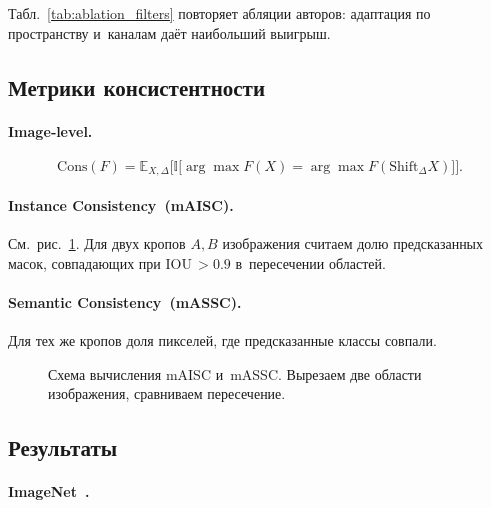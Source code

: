 Табл.~\ref{tab:ablation_filters} повторяет абляции авторов: 
адаптация по пространству и каналам даёт наибольший выигрыш.

\subsection{Метрики консистентности}

\paragraph{Image‑level.} 
\begin{equation}
 \mathrm{Cons}(F)=\mathbb E_{X,\Delta}
  \bigl[\mathbb I\bigl[\arg\max F(X)=\arg\max F(\mathrm{Shift}_{\Delta}X)\bigr]\bigr].
\end{equation}

\paragraph{Instance Consistency (mAISC).} 
См. рис.~\ref{fig:maisc_scheme}. Для двух кропов $A,B$ изображения считаем 
долю предсказанных масок, совпадающих при IOU\,$>0.9$ в пересечении областей.

\paragraph{Semantic Consistency (mASSC).} 
Для тех же кропов доля пикселей, где предсказанные классы совпали.

\begin{figure}[t]
  \centering
  \caption{Схема вычисления mAISC и mASSC.
  Вырезаем две области изображения, сравниваем пересечение.}
  \label{fig:maisc_scheme}
\end{figure}

\subsection{Результаты}

\paragraph{ImageNet \citep{Deng2009ImageNet}.}

